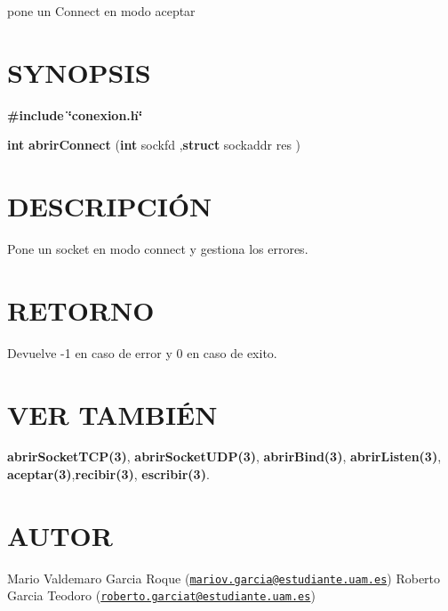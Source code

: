 pone un Connect en modo aceptar\hypertarget{cerrar_canal__s_s_l_SYNOPSIS}{}\section{S\-Y\-N\-O\-P\-S\-I\-S}\label{cerrar_canal__s_s_l_SYNOPSIS}
{\bfseries \#include} {\bfseries \char`\"{}conexion.\-h\char`\"{}} 

{\bfseries int} {\bfseries abrir\-Connect} {\bfseries }({\bfseries int} sockfd ,{\bfseries struct} sockaddr res {\bfseries })\hypertarget{cerrar_canal__s_s_l_descripcion}{}\section{D\-E\-S\-C\-R\-I\-P\-C\-IÓ\-N}\label{cerrar_canal__s_s_l_descripcion}
Pone un socket en modo connect y gestiona los errores.\hypertarget{cerrar_canal__s_s_l_retorno}{}\section{R\-E\-T\-O\-R\-N\-O}\label{cerrar_canal__s_s_l_retorno}
Devuelve -\/1 en caso de error y 0 en caso de exito.\hypertarget{cerrar_canal__s_s_l_seealso}{}\section{V\-E\-R T\-A\-M\-B\-IÉ\-N}\label{cerrar_canal__s_s_l_seealso}
{\bfseries abrir\-Socket\-T\-C\-P(3)}, {\bfseries abrir\-Socket\-U\-D\-P(3)}, {\bfseries abrir\-Bind(3)}, {\bfseries abrir\-Listen(3)}, {\bfseries aceptar(3)},{\bfseries recibir(3)}, {\bfseries escribir(3)}. \hypertarget{cerrar_canal__s_s_l_authors}{}\section{A\-U\-T\-O\-R}\label{cerrar_canal__s_s_l_authors}
Mario Valdemaro Garcia Roque (\href{mailto:mariov.garcia@estudiante.uam.es}{\tt mariov.\-garcia@estudiante.\-uam.\-es}) Roberto Garcia Teodoro (\href{mailto:roberto.garciat@estudiante.uam.es}{\tt roberto.\-garciat@estudiante.\-uam.\-es}) 